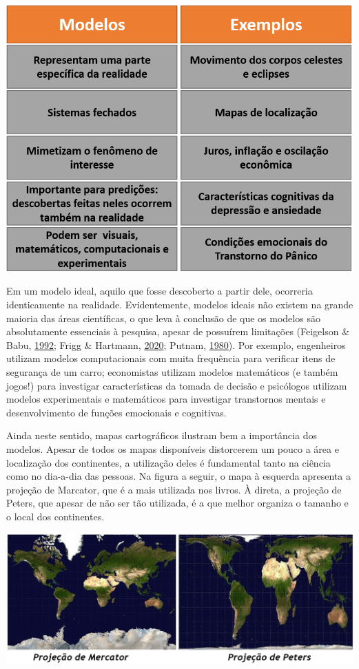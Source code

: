 \documentclass[
]{book}
\begin{document}
\includegraphics{./img/cap_modelos_cientificos.png}

Em um modelo ideal, aquilo que fosse descoberto a partir dele, ocorreria
identicamente na realidade. Evidentemente, modelos ideais não existem na
grande maioria das áreas científicas, o que leva à conclusão de que os
modelos são absolutamente essenciais à pesquisa, apesar de possuírem
limitações (Feigelson \& Babu,
\protect\hyperlink{ref-Feigelson1992}{1992}; Frigg \& Hartmann,
\protect\hyperlink{ref-Firgg2020}{2020}; Putnam,
\protect\hyperlink{ref-Putnam1980}{1980}). Por exemplo, engenheiros
utilizam modelos computacionais com muita frequência para verificar
itens de segurança de um carro; economistas utilizam modelos matemáticos
(e também jogos!) para investigar características da tomada de decisão e
psicólogos utilizam modelos experimentais e matemáticos para investigar
transtornos mentais e desenvolvimento de funções emocionais e
cognitivas.

Ainda neste sentido, mapas cartográficos ilustram bem a importância dos
modelos. Apesar de todos os mapas disponíveis distorcerem um pouco a
área e localização dos continentes, a utilização deles é fundamental
tanto na ciência como no dia-a-dia das pessoas. Na figura a seguir, o
mapa à esquerda apresenta a projeção de Marcator, que é a mais utilizada
nos livros. À direta, a projeção de Peters, que apesar de não ser tão
utilizada, é a que melhor organiza o tamanho e o local dos continentes.

\includegraphics{./img/cap_mapas.png}
\end{document}
